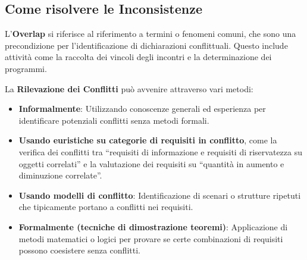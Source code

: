 \subsection{Come risolvere le Inconsistenze}
\begin{figure}[H]
    \centering
\end{figure}
L'\textbf{Overlap} si riferisce al riferimento a termini o fenomeni
comuni, che sono una precondizione per l'identificazione di
dichiarazioni conflittuali. Questo include attività come la
raccolta dei vincoli degli incontri e la determinazione dei programmi.

La \textbf{Rilevazione dei Conflitti} può avvenire attraverso vari
metodi:
\begin{itemize}
  \item \textbf{Informalmente}: Utilizzando conoscenze generali ed
  esperienza per identificare potenziali conflitti senza metodi
  formali.
  \item \textbf{Usando euristiche su categorie di requisiti in
  conflitto}, come la verifica dei conflitti tra ``requisiti di
  informazione e requisiti di riservatezza su oggetti correlati''
  e la valutazione dei requisiti su ``quantità in aumento e
  diminuzione correlate''.
  \item \textbf{Usando modelli di conflitto}: Identificazione di
  scenari o strutture ripetuti che tipicamente portano a conflitti
  nei requisiti.
  \item \textbf{Formalmente (tecniche di dimostrazione teoremi)}:
  Applicazione di metodi matematici o logici per provare se certe
  combinazioni di requisiti possono coesistere senza conflitti.
\end{itemize}

